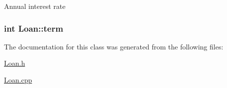 Annual interest rate \hypertarget{classLoan_a9a132d11ff7a8126a1d7b556d03a4ea9}{
\subsubsection[{term}]{\setlength{\rightskip}{0pt plus 5cm}int Loan\+::term\hspace{0.3cm}{\ttfamily [private]}}}\label{classLoan_a9a132d11ff7a8126a1d7b556d03a4ea9}


The documentation for this class was generated from the following files\+:\begin{DoxyCompactItemize}
\item 
\hyperlink{Loan_8h}{Loan.\+h}\item 
\hyperlink{Loan_8cpp}{Loan.\+cpp}\end{DoxyCompactItemize}
